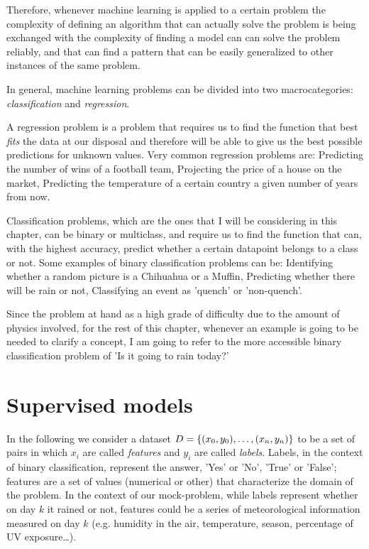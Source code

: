 Therefore, whenever machine learning is applied to a certain problem the complexity of defining an
algorithm that can actually solve the problem is being exchanged with the complexity of finding a
model can can solve the problem reliably, and that can find a pattern that can be easily generalized
to other instances of the same problem.

In general, machine learning problems can be divided into two macrocategories: \emph{classification}
and \emph{regression}.

\smallskip

A regression problem is a problem that requires us to find the function that best \emph{fits} the
data at our disposal and therefore will be able to give us the best possible predictions for unknown
values. Very common regression problems are: Predicting the number of wins of a football team,
Projecting the price of a house on the market, Predicting the temperature of a certain country a
given number of years from now.

\smallskip

Classification problems, which are the ones that I will be considering in this chapter, can be
binary or multiclass, and require us to find the function that can, with the highest accuracy,
predict whether a certain datapoint belongs to a class or not. Some examples of binary
classification problems can be: Identifying whether a random picture is a Chihuahua or a Muffin,
Predicting whether there will be rain or not, Classifying an event as 'quench' or 'non-quench'.

\medskip

Since the problem at hand as a high grade of difficulty due to the amount of physics involved, for
the rest of this chapter, whenever an example is going to be needed to clarify a concept, I am going
to refer to the more accessible binary classification problem of 'Is it going to rain today?'
\section{Supervised models}
In the following we consider a dataset $D = \{(x_0, y_0), \ldots, (x_n, y_n)\}$ to be a set of pairs
in which $x_i$ are called \emph{features} and $y_i$ are called \emph{labels}. Labels, in the context
of binary classification, represent the answer, 'Yes' or 'No', 'True' or 'False'; features are a set of
values (numerical or other) that characterize the domain of the problem. In the context of our mock-problem, while
labels represent whether on day $k$ it rained or not, features could be a series of meteorological
information measured on day $k$ (e.g. humidity in the air, temperature, season, percentage of UV
exposure\ldots).

